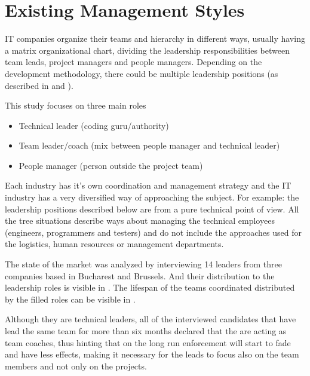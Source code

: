 \chapter{Existing Management Styles}
\label{chapter:existing}
IT companies  organize their teams and hierarchy in different ways, usually having a matrix organizational chart, dividing the leadership responsibilities between team leads, project managers and people managers. Depending on the development methodology, there could be multiple leadership positions (as described in \cite{abur-tl} and \cite{abur-pm}).

This study focuses on three main roles
\begin{itemize}
\item Technical leader (coding guru/authority)
\item Team leader/coach (mix between people manager and technical leader)
\item People manager (person outside the project team)

\end{itemize}
Each industry has it's own coordination and management strategy and the IT industry has a very diversified way of approaching the subject. For example: the leadership positions described below are from a pure technical point of view. All the tree situations describe ways about managing the technical employees (engineers, programmers and testers) and do not include the approaches used for the logistics, human resources or management departments.

The state of the market was analyzed by interviewing 14 leaders from three companies based in Bucharest and Brussels. And their distribution to the leadership roles is visible in . The lifespan of the teams coordinated distributed by the filled roles can be visible in .

 
Although they are technical leaders, all of the interviewed candidates that have lead the same team for more than six months declared that the are acting as team coaches, thus  hinting that on the long run enforcement will start to fade and have less effects, making it necessary for the leads to focus also on the team members and not only on the projects.

